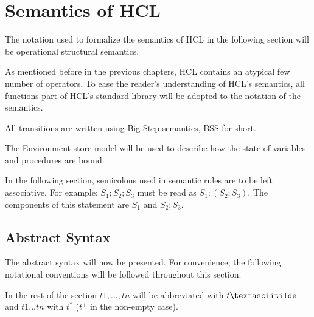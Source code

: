 
\section{Semantics of HCL}

The notation used to formalize the semantics of HCL in the following section will be operational structural semantics.

As mentioned before in the previous chapters, HCL contains an atypical few number of operators.
To ease the reader's understanding of HCL's semantics, all functions part of HCL's standard library will be adopted to the notation of the semantics. 

All transitions are written using Big-Step semantics, BSS for short.

The Environment-store-model will be used to describe how the state of variables and procedures are bound.

In the following section, semicolons used in semantic rules are to be left associative.
For example; $S_1;S_2;S_3$ must be read as $S_1;(S_2;S_3)$.
The components of this statement are $S_1$ and $S_2;S_3$.

\subsection{Abstract Syntax}
The abstract syntax will now be presented.
For convenience, the following notational conventions will be followed throughout this section.

In the rest of the section $t1, ... , tn$ will be abbreviated with $t\textasciitilde$ and $t1 ... tn$ with $t^*$ ($t^+$ in the non-empty case).

